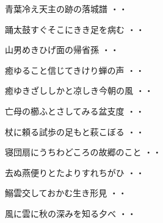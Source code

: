 \begin{shiika}青葉冷え天主の跡の落城譜
\hfill{・・}\end{shiika}
\vspace{0.6cm}
\begin{shiika}踊太鼓すぐそこにきき足を病む
\hfill{・・}\end{shiika}
\vspace{0.6cm}
\begin{shiika}山男めきひげ面の帰省孫
\hfill{・・}\end{shiika}
\vspace{0.6cm}
\begin{shiika}癒ゆること信じてきけり蝉の声
\hfill{・・}\end{shiika}
\vspace{0.6cm}
\begin{shiika}癒ゆきざししかと凉しき今朝の風
\hfill{・・}\end{shiika}
\vspace{0.6cm}
\begin{shiika}亡母の櫛ふとさしてみる盆支度
\hfill{・・}\end{shiika}
\vspace{0.6cm}
\begin{shiika}杖に頼る試歩の足もと萩こぼる
\hfill{・・}\end{shiika}
\vspace{0.6cm}
\begin{shiika}寝団扇にうちわどころの故郷のこと
\hfill{・・}\end{shiika}
\vspace{0.6cm}
\begin{shiika}去ぬ燕便りとたよりすれちがひ
\hfill{・・}\end{shiika}
\vspace{0.6cm}
\begin{shiika}鰯雲交しておかむ生き形見
\hfill{・・}\end{shiika}
\vspace{0.6cm}
\begin{shiika}風に雲に秋の深みを知る夕べ
\hfill{・・}\end{shiika}
\vspace{0.6cm}
